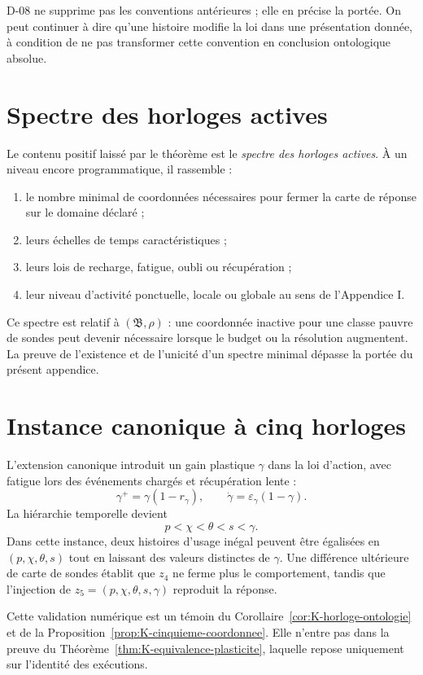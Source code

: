 D-08 ne supprime pas les conventions antérieures ; elle en précise la
portée. On peut continuer à dire qu'une histoire modifie la loi dans une
présentation donnée, à condition de ne pas transformer cette convention
en conclusion ontologique absolue.

\section{Spectre des horloges actives}
\label{annexe-K-spectre}

Le contenu positif laissé par le théorème est le \emph{spectre des
horloges actives}. À un niveau encore programmatique, il rassemble :
\begin{enumerate}
\item le nombre minimal de coordonnées nécessaires pour fermer la carte
de réponse sur le domaine déclaré ;
\item leurs échelles de temps caractéristiques ;
\item leurs lois de recharge, fatigue, oubli ou récupération ;
\item leur niveau d'activité ponctuelle, locale ou globale au sens de
l'Appendice I.
\end{enumerate}
Ce spectre est relatif à $(\mathfrak B,\rho)$ : une coordonnée inactive
pour une classe pauvre de sondes peut devenir nécessaire lorsque le
budget ou la résolution augmentent. La preuve de l'existence et de
l'unicité d'un spectre minimal dépasse la portée du présent appendice.

\section{Instance canonique à cinq horloges}
\label{annexe-K-instance}

L'extension canonique introduit un gain plastique $\gamma$ dans la loi
d'action, avec fatigue lors des événements chargés et récupération lente :
\[
\gamma^+=\gamma(1-r_\gamma),
\qquad
\dot\gamma=\varepsilon_\gamma(1-\gamma).
\]
La hiérarchie temporelle devient
\[
p<\chi<\theta<s<\gamma.
\]
Dans cette instance, deux histoires d'usage inégal peuvent être égalisées
en $(p,\chi,\theta,s)$ tout en laissant des valeurs distinctes de
$\gamma$. Une différence ultérieure de carte de sondes établit que
$z_4$ ne ferme plus le comportement, tandis que l'injection de
$z_5=(p,\chi,\theta,s,\gamma)$ reproduit la réponse.

Cette validation numérique est un témoin du Corollaire~\ref{cor:K-horloge-ontologie} et de la
Proposition~\ref{prop:K-cinquieme-coordonnee}. Elle n'entre pas dans la preuve du Théorème~\ref{thm:K-equivalence-plasticite},
laquelle repose uniquement sur l'identité des exécutions.


